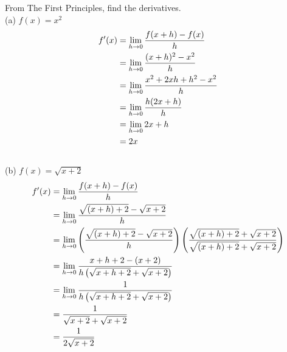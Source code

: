 \begin{exercise}\nonumber
    From The First Principles, find the derivatives. \\

    (a) $ f(x) = x^2 $
    \begin{align}
        f'(x) & = \lim\limits_{h \rightarrow 0}{f(x+h) - f(x) \over h}         \\
              & = \lim\limits_{h \rightarrow 0}{(x+h)^2 - x^2 \over h}         \\
              & = \lim\limits_{h \rightarrow 0}{x^2 + 2xh + h^2 - x^2 \over h} \\
              & = \lim\limits_{h \rightarrow 0}{h(2x+h) \over h}               \\
              & = \lim\limits_{h \rightarrow 0}{2x + h}                        \\
              & = 2x
    \end{align}
    \\

    (b) $ f(x) = \sqrt{x+2} $
    \begin{align}
        f'(x) & = \lim\limits_{h \rightarrow 0}{f(x+h) - f(x) \over h}                                                                                                          \\
              & = \lim\limits_{h \rightarrow 0}{\sqrt{(x+h)+2} - \sqrt{x+2} \over h}                                                                                            \\
              & = \lim\limits_{h \rightarrow 0}{\left({\sqrt{(x+h)+2} - \sqrt{x+2} \over h}\right)\left({\sqrt{(x+h)+2} + \sqrt{x+2} \over \sqrt{(x+h)+2} + \sqrt{x+2}}\right)} \\
              & = \lim\limits_{h \rightarrow 0}{x+h+2 - (x+2) \over h\left(\sqrt{x+h+2} + \sqrt{x+2}\right)}                                                                    \\
              & = \lim\limits_{h \rightarrow 0}{1 \over h\left(\sqrt{x+h+2} + \sqrt{x+2}\right)}                                                                                \\
              & = {1 \over \sqrt{x+2} + \sqrt{x+2}}                                                                                                                             \\
              & = {1 \over 2\sqrt{x+2}}
    \end{align}
\end{exercise}


